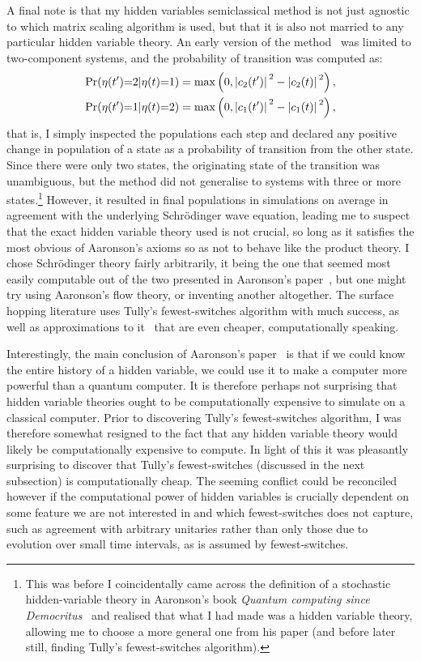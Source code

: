 A final note is that my hidden variables semiclassical method is not just agnostic to which matrix scaling algorithm is used, but that it is also not married to any particular hidden variable theory. An early version of the method~\cite{billington_monte_2015} was limited to two-component systems, and the probability of transition was computed as:
\begin{align} 
\Pr(\eta(t^\prime){=}2|\eta(t){=}1) &=
\max\left(0, \abs{c_2(t^\prime)}^2 - \abs{c_2(t)}^2\right),\\
\Pr(\eta(t^\prime){=}1|\eta(t){=}2) &= 
\max\left(0, \abs{c_1(t^\prime)}^2 - \abs{c_1(t)}^2\right),
\end{align}
that is, I simply inspected the populations each step and declared any positive change in population of a state as a probability of transition from the other state. Since there were only two states, the originating state of the transition was unambiguous, but the method did not generalise to systems with three or more states.\footnote{This was before I coincidentally came across the definition of a stochastic hidden-variable theory in Aaronson's book \emph{Quantum computing since Democritus}~\cite{aaronson_quantum_2013} and realised that what I had made was a hidden variable theory, allowing me to choose a more general one from his paper (and before later still, finding Tully's fewest-switches algorithm).} However, it resulted in final populations in simulations on average in agreement with the underlying Schr\"odinger wave equation, leading me to suspect that the exact hidden variable theory used is not crucial, so long as it satisfies the most obvious of Aaronson's axioms so as not to behave like the product theory. I chose Schr\"odinger theory fairly arbitrarily, it being the one that seemed most easily computable out of the two presented in Aaronson's paper~\cite{PhysRevA.71.032325}, but one might try using Aaronson's flow theory, or inventing another altogether. The surface hopping literature uses Tully's fewest-switches algorithm with much success, as well as approximations to it~\cite{FABIANO2008111} that are even cheaper, computationally speaking.

Interestingly, the main conclusion of Aaronson's paper~\cite{PhysRevA.71.032325} is that if we could know the entire history of a hidden variable, we could use it to make a computer more powerful than a quantum computer. It is therefore perhaps not surprising that hidden variable theories ought to be computationally expensive to simulate on a classical computer. Prior to discovering Tully's fewest-switches algorithm, I was therefore somewhat resigned to the fact that any hidden variable theory would likely be computationally expensive to compute. In light of this it was pleasantly surprising to discover that Tully's fewest-switches (discussed in the next subsection) is computationally cheap. The seeming conflict could be reconciled however if the computational power of hidden variables is crucially dependent on some feature we are not interested in and which fewest-switches does not capture, such as agreement with arbitrary unitaries rather than only those due to evolution over small time intervals, as is assumed by fewest-switches.


